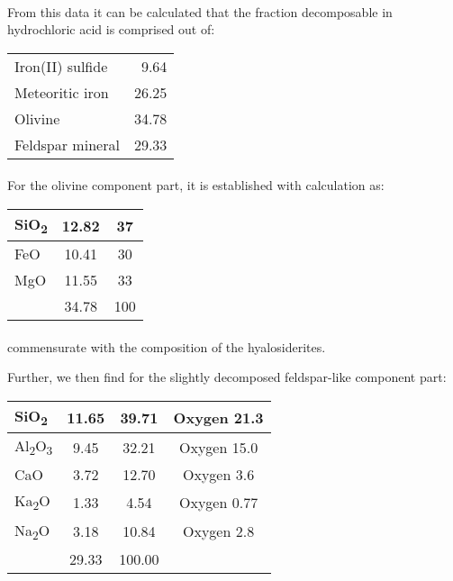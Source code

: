 \documentclass[a4paper, 12pt, oneside]{article}
\begin{document}
\paragraph{}
From this data it can be calculated that the fraction decomposable in hydrochloric acid is comprised out of:
\begin{center}
    \begin{tabular}{l r}
        Iron(II) sulfide & 9.64\\
        Meteoritic iron & 26.25\\
        Olivine & 34.78\\
        Feldspar mineral & 29.33\\
    \end{tabular}
\end{center}
\paragraph{}
For the olivine component part, it is established with calculation as:
\begin{center}
    \begin{tabular}{ |l|c|c| }
        \hline
        SiO\textsubscript{2} & 12.82 & 37\\\hline
        FeO & 10.41 & 30\\\hline
        MgO & 11.55 & 33\\\hline
         & 34.78 & 100\\
        \hline
    \end{tabular}
\end{center}
\paragraph{}
commensurate with the composition of the hyalosiderites.

Further, we then find for the slightly decomposed feldspar-like component part:
\begin{center}
    \begin{tabular}{ |l|c|c|c| }
        \hline
        SiO\textsubscript{2} & 11.65 & 39.71 & Oxygen 21.3\\\hline
        Al\textsubscript{2}O\textsubscript{3} & 9.45 & 32.21 & Oxygen 15.0\\\hline
        CaO & 3.72 & 12.70 & Oxygen 3.6\\\hline
        Ka\textsubscript{2}O & 1.33 & 4.54 & Oxygen 0.77\\\hline
        Na\textsubscript{2}O & 3.18 & 10.84 & Oxygen 2.8\\\hline
         & 29.33 & 100.00 & \\
        \hline
    \end{tabular}
\end{center}
\end{document}
